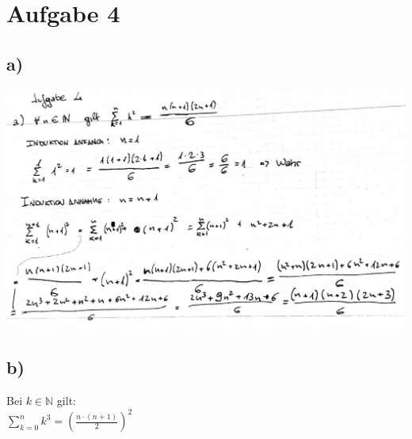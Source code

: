 \documentclass[14pt,a4paper,landscape]{article}
\begin{document}
\section*{Aufgabe 4}
\subsection*{a)}
\includegraphics[scale=0.3]{AB2-4_1.jpg} 
\subsection*{b)} 
Bei $k \in \mathbb{N} $ gilt:\\
$
\sum_{k=0}^{n}k^3 = \left( \frac{n \cdot (n+1)}{2} \right)^2
$
\end{document}
